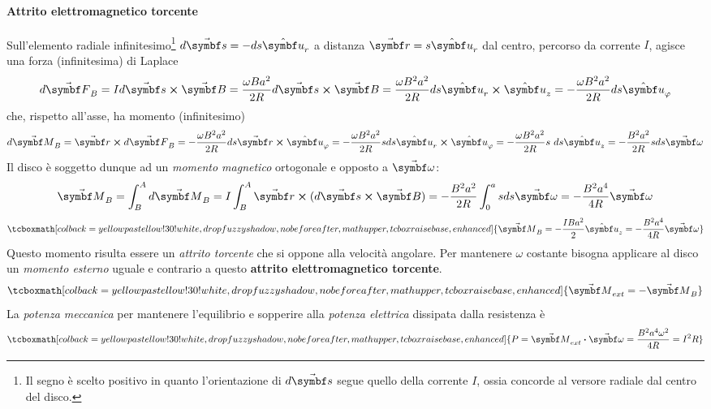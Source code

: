 \paragraph{Attrito elettromagnetico torcente}
Sull'elemento radiale infinitesimo\footnote{Il segno è scelto positivo in quanto l'orientazione di $d\vba{s}$ segue quello della corrente $I$, ossia concorde al versore radiale dal centro del disco.} $d\vba{s}=-ds\vbh{u}_r$ a distanza $\vba{r}=s\vbh{u}_r$ dal centro, percorso da corrente $I$, agisce una forza (infinitesima) di Laplace
\begin{equation*}
	d\vba{F}_B=I d\vba{s}\cross \vba{B}=\frac{\omega B a^2}{2R}d\vba{s}\cross \vba{B}=\frac{\omega B^2 a^2}{2R}ds\vbh{u}_r\cross \vbh{u}_z=-\frac{\omega B^2 a^2}{2R} ds\vbh{u}_{\phi}
\end{equation*}
che, rispetto all'asse, ha momento (infinitesimo)
\begin{equation*}
	d\vba{M}_B=\vba{r}\cross d\vba{F}_B=-\frac{\omega B^2 a^2}{2R}ds\vba{r}\cross\vbh{u}_{\phi}=-\frac{\omega B^2 a^2}{2R}sds\vbh{u}_r\cross\vbh{u}_{\phi}=-\frac{\omega B^2 a^2}{2R}s\ ds\vbh{u}_{z}=-\frac{B^2a^2}{2R}sds\vba{\omega}
\end{equation*}
Il disco è soggetto dunque ad un \textit{momento magnetico} ortogonale e opposto a $\vba{\omega}$:
\begin{equation*}
	\vba{M}_B=\int_{B}^{A}d\vba{M}_B=I\int_{B}^{A}\vba{r}\cross(d\vba{s}\cross\vba{B})=-\frac{B^2a^2}{2R}\int_{0}^{a}sds\vba{\omega}=-\frac{B^2a^4}{4R}\vba{\omega}
\end{equation*}
\begin{equation}
	\tcboxmath[colback=yellowpastellow!30!white,drop fuzzy shadow, nobeforeafter, math upper, tcbox raise base, enhanced]{\vba{M}_B=-\frac{IBa^2}{2}\vbh{u}_z=-\frac{B^2a^4}{4R}\vba{\omega}}
\end{equation}
Questo momento risulta essere un \textit{attrito torcente} che si oppone alla velocità angolare. Per mantenere $\omega$ costante bisogna applicare al disco un \textit{momento esterno} uguale e contrario a questo \textbf{attrito elettromagnetico torcente}.
\begin{equation*}
	\tcboxmath[colback=yellowpastellow!30!white,drop fuzzy shadow, nobeforeafter, math upper, tcbox raise base, enhanced]{\vba{M}_{ext}=-\vba{M}_B}
\end{equation*}
La \textit{potenza meccanica} per mantenere l'equilibrio e sopperire alla \textit{potenza elettrica} dissipata dalla resistenza è
\begin{equation}
	\tcboxmath[colback=yellowpastellow!30!white,drop fuzzy shadow, nobeforeafter, math upper, tcbox raise base, enhanced]{P=\vba{M}_{ext}\vdot\vba{\omega}=\frac{B^2a^4\omega^2}{4R}=I^2R}
\end{equation}
